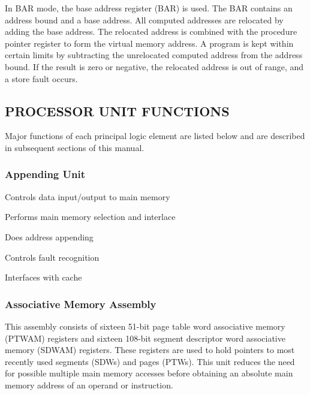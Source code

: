 
In BAR mode, the base address register (BAR) is used. The BAR contains an
address bound and a base address. All computed addresses are relocated by
adding the base address. The relocated address is combined with the procedure
pointer register to form the virtual memory address. A program is kept within
certain limits by subtracting the unrelocated computed address from the address
bound. If the result is zero or negative, the relocated address is out of
range, and a store fault occurs.  

\subsection{PROCESSOR UNIT FUNCTIONS}


Major functions of each principal logic element are listed below and are
described in subsequent sections of this manual.


\subsubsection{Appending Unit}

\begin{description}

\item
Controls data input/output to main memory

\item
Performs main memory selection and interlace

\item
Does address appending

\item
Controls fault recognition

\item
Interfaces with cache

\end{description}


\subsubsection{Associative Memory Assembly}


This assembly consists of sixteen 51-bit page table word associative memory
(PTWAM) registers and sixteen 108-bit segment descriptor word associative
memory (SDWAM) registers.  These registers are used to hold pointers to most
recently used segments (SDWs) and pages (PTWs). This unit reduces the need for
possible multiple main memory accesses before obtaining an absolute main memory
address of an operand or instruction.  



